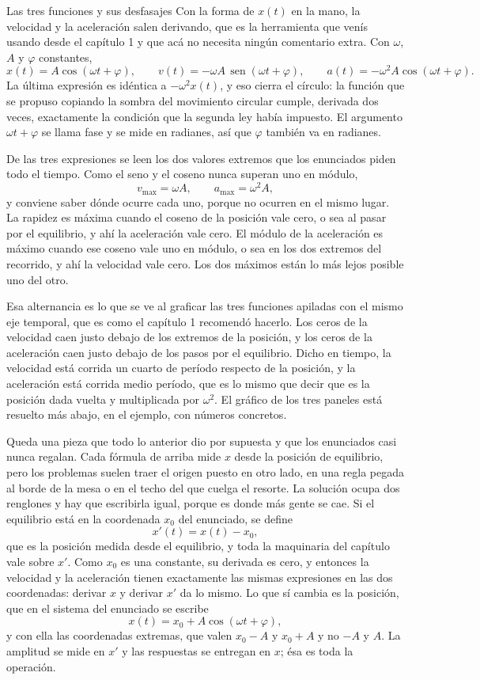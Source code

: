 \documentclass[11pt,openany]{book}
\newcommand{\sen}{\operatorname{sen}}
\begin{document}
\begin{bloque}{Las tres funciones y sus desfasajes}
Con la forma de $x(t)$ en la mano, la velocidad y la aceleración salen derivando, que es la herramienta que venís usando desde el capítulo 1 y que acá no necesita ningún comentario extra. Con $\omega$, $A$ y $\varphi$ constantes,
\[
x(t) = A\cos(\omega t+\varphi),
\qquad
v(t) = -\omega A\,\sen(\omega t+\varphi),
\qquad
a(t) = -\omega^{2} A\cos(\omega t+\varphi) .
\]
La última expresión es idéntica a $-\omega^2 x(t)$, y eso cierra el círculo: la función que se propuso copiando la sombra del movimiento circular cumple, derivada dos veces, exactamente la condición que la segunda ley había impuesto. El argumento $\omega t + \varphi$ se llama fase y se mide en radianes, así que $\varphi$ también va en radianes.

De las tres expresiones se leen los dos valores extremos que los enunciados piden todo el tiempo. Como el seno y el coseno nunca superan uno en módulo,
\[
v_{\max} = \omega A,
\qquad
a_{\max} = \omega^{2} A ,
\]
y conviene saber dónde ocurre cada uno, porque no ocurren en el mismo lugar. La rapidez es máxima cuando el coseno de la posición vale cero, o sea al pasar por el equilibrio, y ahí la aceleración vale cero. El módulo de la aceleración es máximo cuando ese coseno vale uno en módulo, o sea en los dos extremos del recorrido, y ahí la velocidad vale cero. Los dos máximos están lo más lejos posible uno del otro.

Esa alternancia es lo que se ve al graficar las tres funciones apiladas con el mismo eje temporal, que es como el capítulo 1 recomendó hacerlo. Los ceros de la velocidad caen justo debajo de los extremos de la posición, y los ceros de la aceleración caen justo debajo de los pasos por el equilibrio. Dicho en tiempo, la velocidad está corrida un cuarto de período respecto de la posición, y la aceleración está corrida medio período, que es lo mismo que decir que es la posición dada vuelta y multiplicada por $\omega^2$. El gráfico de los tres paneles está resuelto más abajo, en el ejemplo, con números concretos.

Queda una pieza que todo lo anterior dio por supuesta y que los enunciados casi nunca regalan. Cada fórmula de arriba mide $x$ desde la posición de equilibrio, pero los problemas suelen traer el origen puesto en otro lado, en una regla pegada al borde de la mesa o en el techo del que cuelga el resorte. La solución ocupa dos renglones y hay que escribirla igual, porque es donde más gente se cae. Si el equilibrio está en la coordenada $x_0$ del enunciado, se define
\[
x'(t) = x(t) - x_0 ,
\]
que es la posición medida desde el equilibrio, y toda la maquinaria del capítulo vale sobre $x'$. Como $x_0$ es una constante, su derivada es cero, y entonces la velocidad y la aceleración tienen exactamente las mismas expresiones en las dos coordenadas: derivar $x$ y derivar $x'$ da lo mismo. Lo que sí cambia es la posición, que en el sistema del enunciado se escribe
\[
x(t) = x_0 + A\cos(\omega t+\varphi) ,
\]
y con ella las coordenadas extremas, que valen $x_0 - A$ y $x_0 + A$ y no $-A$ y $A$. La amplitud se mide en $x'$ y las respuestas se entregan en $x$; ésa es toda la operación.


\end{bloque}
\end{document}
